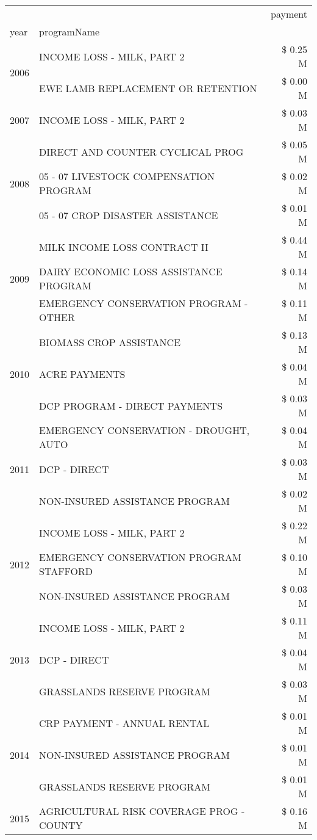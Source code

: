 \begin{tabular}{llr}
\toprule
 &  & payment \\
year & programName &  \\
\midrule
\multirow[t]{2}{*}{2006} & INCOME LOSS - MILK, PART 2 & \$ 0.25 M \\
 & EWE LAMB REPLACEMENT OR RETENTION & \$ 0.00 M \\
\cline{1-3}
2007 & INCOME LOSS - MILK, PART 2 & \$ 0.03 M \\
\cline{1-3}
\multirow[t]{3}{*}{2008} & DIRECT AND COUNTER CYCLICAL PROG & \$ 0.05 M \\
 & 05 - 07 LIVESTOCK COMPENSATION PROGRAM & \$ 0.02 M \\
 & 05 - 07 CROP DISASTER ASSISTANCE & \$ 0.01 M \\
\cline{1-3}
\multirow[t]{3}{*}{2009} & MILK INCOME LOSS CONTRACT II & \$ 0.44 M \\
 & DAIRY ECONOMIC LOSS ASSISTANCE PROGRAM & \$ 0.14 M \\
 & EMERGENCY CONSERVATION PROGRAM - OTHER & \$ 0.11 M \\
\cline{1-3}
\multirow[t]{3}{*}{2010} & BIOMASS CROP ASSISTANCE & \$ 0.13 M \\
 & ACRE PAYMENTS & \$ 0.04 M \\
 & DCP PROGRAM - DIRECT PAYMENTS & \$ 0.03 M \\
\cline{1-3}
\multirow[t]{3}{*}{2011} & EMERGENCY CONSERVATION - DROUGHT, AUTO & \$ 0.04 M \\
 & DCP - DIRECT & \$ 0.03 M \\
 & NON-INSURED ASSISTANCE PROGRAM & \$ 0.02 M \\
\cline{1-3}
\multirow[t]{3}{*}{2012} & INCOME LOSS - MILK, PART 2 & \$ 0.22 M \\
 & EMERGENCY CONSERVATION PROGRAM STAFFORD & \$ 0.10 M \\
 & NON-INSURED ASSISTANCE PROGRAM & \$ 0.03 M \\
\cline{1-3}
\multirow[t]{3}{*}{2013} & INCOME LOSS - MILK, PART 2 & \$ 0.11 M \\
 & DCP - DIRECT & \$ 0.04 M \\
 & GRASSLANDS RESERVE PROGRAM & \$ 0.03 M \\
\cline{1-3}
\multirow[t]{3}{*}{2014} & CRP PAYMENT - ANNUAL RENTAL & \$ 0.01 M \\
 & NON-INSURED ASSISTANCE PROGRAM & \$ 0.01 M \\
 & GRASSLANDS RESERVE PROGRAM & \$ 0.01 M \\
\cline{1-3}
\multirow[t]{3}{*}{2015} & AGRICULTURAL RISK COVERAGE PROG - COUNTY & \$ 0.16 M \\

\end{tabular}

